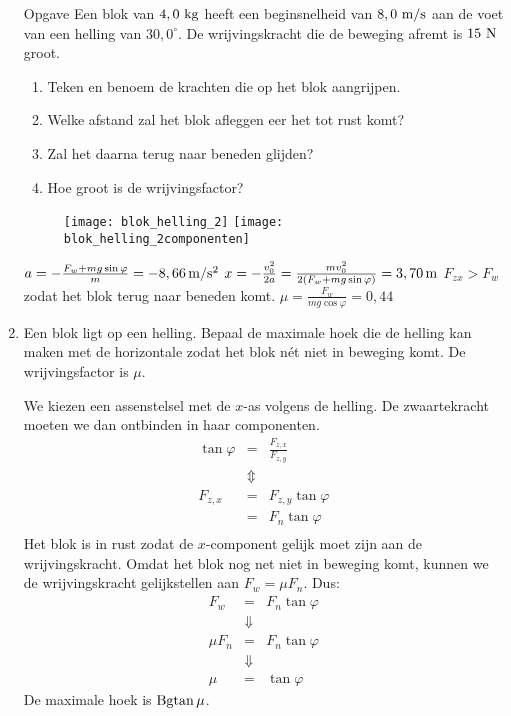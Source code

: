 \begin{enumerate}
\item[Opgave] Een blok van $4,0~\rm kg$ heeft een beginsnelheid van $8,0~\rm m/s$ aan de voet van een helling van $30,0^\circ$. De wrijvingskracht die de beweging afremt is $15~\rm N$ groot.
\begin{enumerate}
\item Teken en benoem de krachten die op het blok aangrijpen.
\item Welke afstand zal het blok afleggen eer het tot rust komt?
\item Zal het daarna terug naar beneden glijden?
\item Hoe groot is de wrijvingsfactor?
\end{enumerate}
\begin{oplossing}
\begin{figure}[h]
\begin{flushright}
\texttt{[image: blok\_helling\_2]}
\texttt{[image: blok\_helling\_2componenten]}
\end{flushright}
\end{figure}
$a=-\frac{F_w+mg\sin\varphi}{m}=-8,66\rm\,m/s^2$
\newline
$x=-\frac{v_0^2}{2a}=\frac{mv_0^2}{2(F_w+mg\sin\varphi)}=3,70\rm\,m$ %
\newline
$F_{zx}>F_w$ zodat het blok terug naar beneden komt. 
\newline
$\mu=\frac{F_w}{mg\cos\varphi}=0,44$
\end{oplossing}



\item Een blok ligt op een helling. Bepaal de maximale hoek die de
helling kan maken met de horizontale zodat het blok n\'et niet in
beweging komt. De wrijvingsfactor is $\mu$.
\begin{oplossing}
\newline
We kiezen een assenstelsel met de $x$-as volgens de helling. De
zwaartekracht moeten we dan ontbinden in haar componenten.
\begin{eqnarray*}
\tan{\varphi}&=&\frac{F_{z,x}}{F_{z,y}}\\
&\Updownarrow&\\
F_{z,x}&=&F_{z,y}\tan{\varphi}\\
&=&F_n\tan{\varphi}\\
\end{eqnarray*}
Het blok is in rust zodat de $x$-component gelijk moet zijn aan de
wrij\-vings\-kracht. Omdat het blok nog net niet in beweging komt,
kunnen we de wrijvingskracht gelijkstellen aan $F_w=\mu F_n$. Dus:
\begin{eqnarray*}
F_w&=&F_n\tan{\varphi}\\
&\Downarrow&\\
\mu F_n&=&F_n\tan{\varphi}\\
&\Downarrow&\\
\mu&=&\tan{\varphi}
\end{eqnarray*}
De maximale hoek is ${\rm Bgtan\,}\mu$.
\end{oplossing}


\end{enumerate}
